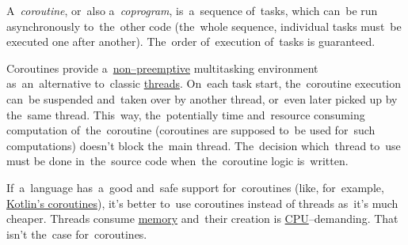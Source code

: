 \label{coroutines}
\mbox{A \textit{coroutine}}, or~also \mbox{a \textit{coprogram},} is~a~sequence of~tasks, which can~be run asynchronously to~the~other code (the~whole sequence, individual tasks must~be executed one after another).
The~order of~execution of~tasks is guaranteed.

Coroutines provide a~\hyperref[preemption]{non--preemptive} multitasking environment as~an~alternative to~classic \hyperref[multithreading]{threads}.
On~each task start, the~coroutine execution can~be suspended and~taken over by another thread, or~even later picked up by the~same thread.
This~way, the~potentially time and~resource consuming computation of~the~coroutine (coroutines are supposed to~be used for~such computations) doesn't block the~main thread.
The~decision which~thread to~use must be done in~the~source code when~the~coroutine logic \mbox{is written.}

If~a~language has~a~good and~safe support for~coroutines (like, for~example, \hyperref[kotlincoroutine]{Kotlin's coroutines}), it's better to~use coroutines instead of threads as~it's much cheaper.
Threads consume \hyperref[systemmemory]{memory} and~their creation is \hyperref[processorcpucore]{CPU}--demanding.
That isn't the~case for~coroutines.
